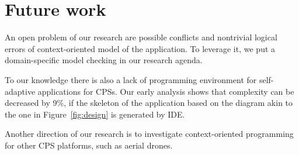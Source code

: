 \section{Future work}

An open problem of our research are possible conflicts and nontrivial
logical errors of context-oriented model of the application. To leverage it, we
put a domain-specific model checking in our research agenda.

To our knowledge there is also a lack of programming environment for
self-adaptive applications for CPSs. Our early analysis shows that complexity
can be decreased by 9\%, if the skeleton of the application based on the diagram
akin to the one in Figure~\ref{fig:design} is generated by IDE.

Another direction of our research is to investigate context-oriented programming
for other CPS platforms, such as aerial drones.
